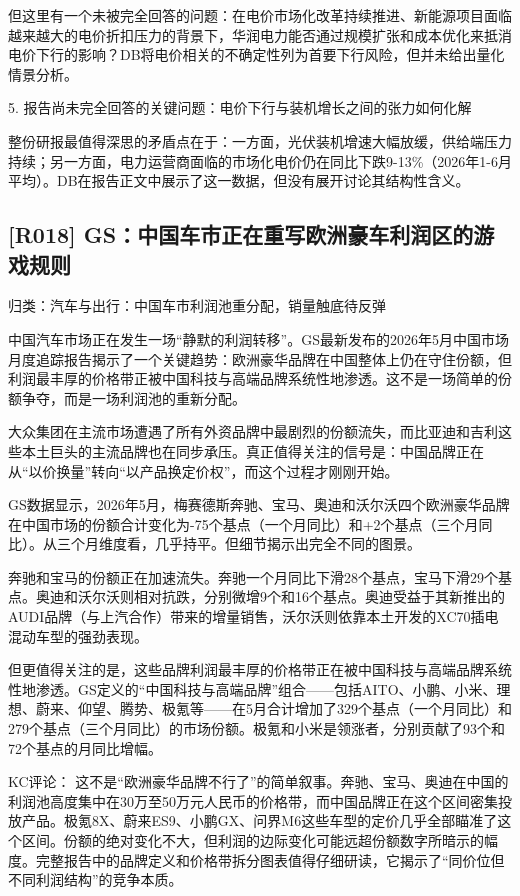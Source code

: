 \documentclass[11pt]{ctexart}
\begin{document}
但这里有一个未被完全回答的问题：在电价市场化改革持续推进、新能源项目面临越来越大的电价折扣压力的背景下，华润电力能否通过规模扩张和成本优化来抵消电价下行的影响？DB将电价相关的不确定性列为首要下行风险，但并未给出量化情景分析。

5. 报告尚未完全回答的关键问题：电价下行与装机增长之间的张力如何化解

整份研报最值得深思的矛盾点在于：一方面，光伏装机增速大幅放缓，供给端压力持续；另一方面，电力运营商面临的市场化电价仍在同比下跌9-13\%（2026年1-6月平均）。DB在报告正文中展示了这一数据，但没有展开讨论其结构性含义。

\subsection{[R018] GS：中国车市正在重写欧洲豪车利润区的游戏规则}
{\small\color{refgray}归类：汽车与出行：中国车市利润池重分配，销量触底待反弹}

中国汽车市场正在发生一场“静默的利润转移”。GS最新发布的2026年5月中国市场月度追踪报告揭示了一个关键趋势：欧洲豪华品牌在中国整体上仍在守住份额，但利润最丰厚的价格带正被中国科技与高端品牌系统性地渗透。这不是一场简单的份额争夺，而是一场利润池的重新分配。

大众集团在主流市场遭遇了所有外资品牌中最剧烈的份额流失，而比亚迪和吉利这些本土巨头的主流品牌也在同步承压。真正值得关注的信号是：中国品牌正在从“以价换量”转向“以产品换定价权”，而这个过程才刚刚开始。

GS数据显示，2026年5月，梅赛德斯奔驰、宝马、奥迪和沃尔沃四个欧洲豪华品牌在中国市场的份额合计变化为-75个基点（一个月同比）和+2个基点（三个月同比）。从三个月维度看，几乎持平。但细节揭示出完全不同的图景。

奔驰和宝马的份额正在加速流失。奔驰一个月同比下滑28个基点，宝马下滑29个基点。奥迪和沃尔沃则相对抗跌，分别微增9个和16个基点。奥迪受益于其新推出的AUDI品牌（与上汽合作）带来的增量销售，沃尔沃则依靠本土开发的XC70插电混动车型的强劲表现。

但更值得关注的是，这些品牌利润最丰厚的价格带正在被中国科技与高端品牌系统性地渗透。GS定义的“中国科技与高端品牌”组合——包括AITO、小鹏、小米、理想、蔚来、仰望、腾势、极氪等——在5月合计增加了329个基点（一个月同比）和279个基点（三个月同比）的市场份额。极氪和小米是领涨者，分别贡献了93个和72个基点的月同比增幅。

KC评论： 这不是“欧洲豪华品牌不行了”的简单叙事。奔驰、宝马、奥迪在中国的利润池高度集中在30万至50万元人民币的价格带，而中国品牌正在这个区间密集投放产品。极氪8X、蔚来ES9、小鹏GX、问界M6这些车型的定价几乎全部瞄准了这个区间。份额的绝对变化不大，但利润的边际变化可能远超份额数字所暗示的幅度。完整报告中的品牌定义和价格带拆分图表值得仔细研读，它揭示了“同价位但不同利润结构”的竞争本质。
\end{document}
